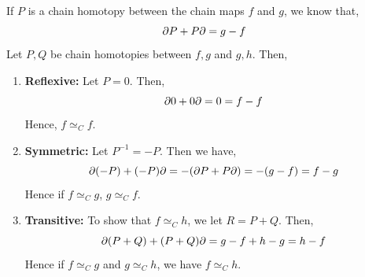 \documentclass[12pt]{article}
\begin{document}
\begin{solution}
    \bbni

    If $P$ is a chain homotopy between the chain maps $f$ and $g$, we know that, 
    \[\partial P + P \partial = g - f\]
    Let $P, Q$ be chain homotopies between $f,g$ and $g,h$. Then, 
    \begin{enumerate}
        \item \textbf{Reflexive:} Let $P = 0$. Then, 
         \[\partial 0 + 0 \partial = 0 =  f - f\] 
        Hence, $f \simeq_C f$. 
        \item \textbf{Symmetric:} Let $P^{-1} = - P$. Then we have, 
         \[\partial (-P) + (-P) \partial = - (\partial P + P \partial) = - (g - f) = f - g\]
        Hence if $f \simeq_C g$, $g \simeq_C f$. 
        \item \textbf{Transitive:} To show that $f \simeq_C h$, we let $R = P + Q$. 
        Then,  
        \[\partial (P +Q ) + (P + Q) \partial = g - f + h -g = h - f \]
        Hence if $f \simeq_C g$ and $g \simeq_C h$, we have $f \simeq_C h$. 
    \end{enumerate}
\end{solution}
\end{document}
